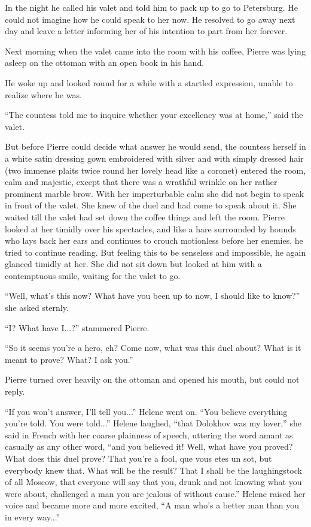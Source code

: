 In the night he called his valet and told him to pack up to go to
Petersburg. He could not imagine how he could speak to her
now. He resolved to go away next day and leave a letter informing
her of his intention to part from her forever.

Next morning when the valet came into the room with his coffee,
Pierre was lying asleep on the ottoman with an open book in his
hand.

He woke up and looked round for a while with a startled
expression, unable to realize where he was.

``The countess told me to inquire whether your excellency was at
home,'' said the valet.

But before Pierre could decide what answer he would send, the
countess herself in a white satin dressing gown embroidered with
silver and with simply dressed hair (two immense plaits twice
round her lovely head like a coronet) entered the room, calm and
majestic, except that there was a wrathful wrinkle on her rather
prominent marble brow. With her imperturbable calm she did not
begin to speak in front of the valet. She knew of the duel and
had come to speak about it. She waited till the valet had set
down the coffee things and left the room. Pierre looked at her
timidly over his spectacles, and like a hare surrounded by hounds
who lays back her ears and continues to crouch motionless before
her enemies, he tried to continue reading. But feeling this to be
senseless and impossible, he again glanced timidly at her. She
did not sit down but looked at him with a contemptuous smile,
waiting for the valet to go.

``Well, what's this now? What have you been up to now, I should
like to know?'' she asked sternly.

``I? What have I...?'' stammered Pierre.

``So it seems you're a hero, eh? Come now, what was this duel
about? What is it meant to prove? What? I ask you.''

Pierre turned over heavily on the ottoman and opened his mouth,
but could not reply.

``If you won't answer, I'll tell you...'' Helene went on. ``You
believe everything you're told. You were told...'' Helene
laughed, ``that Dolokhov was my lover,'' she said in French with
her coarse plainness of speech, uttering the word amant as
casually as any other word, ``and you believed it! Well, what
have you proved? What does this duel prove? That you're a fool,
que vous etes un sot, but everybody knew that. What will be the
result? That I shall be the laughingstock of all Moscow, that
everyone will say that you, drunk and not knowing what you were
about, challenged a man you are jealous of without cause.''
Helene raised her voice and became more and more excited, ``A man
who's a better man than you in every way...''

